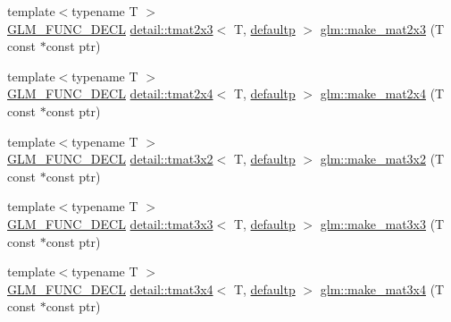 \begin{DoxyCompactItemize}
\item 
{\footnotesize template$<$typename T $>$ }\\\hyperlink{setup_8hpp_ab2d052de21a70539923e9bcbf6e83a51}{G\+L\+M\+\_\+\+F\+U\+N\+C\+\_\+\+D\+E\+CL} \hyperlink{structglm_1_1detail_1_1tmat2x3}{detail\+::tmat2x3}$<$ T, \hyperlink{namespaceglm_a0f04f086094c747d227af4425893f545a9d21ccd8b5a009ec7eb7677befc3bf51}{defaultp} $>$ \hyperlink{group__gtc__type__ptr_gadef48cd950566f23a4b1e47127ee478c}{glm\+::make\+\_\+mat2x3} (T const $\ast$const ptr)
\item 
{\footnotesize template$<$typename T $>$ }\\\hyperlink{setup_8hpp_ab2d052de21a70539923e9bcbf6e83a51}{G\+L\+M\+\_\+\+F\+U\+N\+C\+\_\+\+D\+E\+CL} \hyperlink{structglm_1_1detail_1_1tmat2x4}{detail\+::tmat2x4}$<$ T, \hyperlink{namespaceglm_a0f04f086094c747d227af4425893f545a9d21ccd8b5a009ec7eb7677befc3bf51}{defaultp} $>$ \hyperlink{group__gtc__type__ptr_ga174a43e8913682834de9cd918e36df25}{glm\+::make\+\_\+mat2x4} (T const $\ast$const ptr)
\item 
{\footnotesize template$<$typename T $>$ }\\\hyperlink{setup_8hpp_ab2d052de21a70539923e9bcbf6e83a51}{G\+L\+M\+\_\+\+F\+U\+N\+C\+\_\+\+D\+E\+CL} \hyperlink{structglm_1_1detail_1_1tmat3x2}{detail\+::tmat3x2}$<$ T, \hyperlink{namespaceglm_a0f04f086094c747d227af4425893f545a9d21ccd8b5a009ec7eb7677befc3bf51}{defaultp} $>$ \hyperlink{group__gtc__type__ptr_gaa40868af4de8c5ed5470fdcc9985dbfc}{glm\+::make\+\_\+mat3x2} (T const $\ast$const ptr)
\item 
{\footnotesize template$<$typename T $>$ }\\\hyperlink{setup_8hpp_ab2d052de21a70539923e9bcbf6e83a51}{G\+L\+M\+\_\+\+F\+U\+N\+C\+\_\+\+D\+E\+CL} \hyperlink{structglm_1_1detail_1_1tmat3x3}{detail\+::tmat3x3}$<$ T, \hyperlink{namespaceglm_a0f04f086094c747d227af4425893f545a9d21ccd8b5a009ec7eb7677befc3bf51}{defaultp} $>$ \hyperlink{group__gtc__type__ptr_gaf8ba0a0a523423ae1149a1c2d90eb337}{glm\+::make\+\_\+mat3x3} (T const $\ast$const ptr)
\item 
{\footnotesize template$<$typename T $>$ }\\\hyperlink{setup_8hpp_ab2d052de21a70539923e9bcbf6e83a51}{G\+L\+M\+\_\+\+F\+U\+N\+C\+\_\+\+D\+E\+CL} \hyperlink{structglm_1_1detail_1_1tmat3x4}{detail\+::tmat3x4}$<$ T, \hyperlink{namespaceglm_a0f04f086094c747d227af4425893f545a9d21ccd8b5a009ec7eb7677befc3bf51}{defaultp} $>$ \hyperlink{group__gtc__type__ptr_gaa0c07ac459a5e16374aa12e3b35ee043}{glm\+::make\+\_\+mat3x4} (T const $\ast$const ptr)

\end{DoxyCompactItemize}
